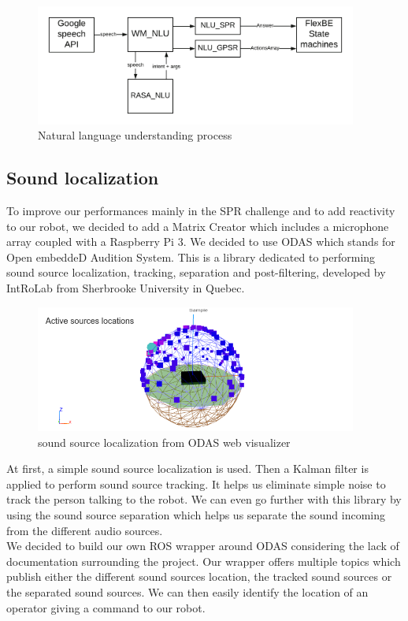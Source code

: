 \documentclass[runningheads,a4paper]{llncs}
\begin{document}
\begin{figure}
  \centering
  \includegraphics[width=300pt]{images/wm_nlu.png}
  \caption{Natural language understanding process}
\end{figure} 

\subsection{Sound localization}
\tab To improve our performances mainly in the SPR challenge and to add reactivity to our robot, we decided to add a Matrix Creator which includes a microphone array coupled with a Raspberry Pi 3. We decided to use ODAS  \cite{ODAS} which stands for Open embeddeD Audition System. This is a library dedicated to performing sound source localization, tracking, separation and post-filtering, developed by IntRoLab\cite{Introlab} from Sherbrooke University in Quebec.\\ 

\begin{figure}
  \centering
  \includegraphics[width=300pt]{images/odas.png}
  \caption{ sound source localization from ODAS web visualizer \cite{ODAS}}
\end{figure} 

At first, a simple sound source localization is used. Then a Kalman filter is applied to perform sound source tracking. It helps us eliminate simple noise to track the person talking to the robot. We can even go further with this library by using the sound source separation which helps us separate the sound incoming from the different audio sources.\\

We decided to build our own ROS wrapper around ODAS considering the lack of documentation surrounding the project. Our wrapper offers multiple topics which publish either the different sound sources location, the tracked sound sources or the separated sound sources. We can then easily identify the location of an operator giving a command to our robot.\\
\end{document}
